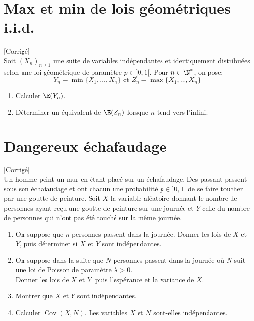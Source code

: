 \documentclass[8pt]{book}
\begin{document}
\section{Max et min de lois géométriques i.i.d. }
\label{Max et min de lois géométriques iid}
\textcolor{blue}{\hyperref[Max et min de lois géométriques iid corrigé]{[Corrigé]}}\\
Soit $(X_n)_{n\geq1}$ une suite de variables indépendantes et identiquement distribuées selon une loi géométrique de paramètre $p\in]0,1[$. Pour $n\in\N^*$, on pose: $$Y_n=\min\{X_1,\dots,X_n\} \text{ et } Z_n=\max\{X_1,\dots,X_n\}$$
\begin{enumerate}
	\item Calculer $\E(Y_n)$.
	\item Déterminer un équivalent de $\E(Z_n)$ lorsque $n$ tend vers l'infini.
\end{enumerate}

\section{Dangereux échafaudage }
\label{Dangereux échafaudage}
\textcolor{blue}{\hyperref[Dangereux échafaudage corrigé]{[Corrigé]}}\\
Un homme peint un mur en étant placé sur un échafaudage. Des passant passent sous son échafaudage et ont chacun une probabilité $p\in ]0,1[$ de se faire toucher par une goutte de peinture. Soit $X$ la variable aléatoire donnant le nombre de personnes ayant reçu une goutte de peinture sur une journée et $Y$ celle du nombre de personnes qui n'ont pas été touché sur la même journée.
\begin{enumerate}
	\item On suppose que $n$ personnes passent dans la journée.
	Donner les lois de $X$ et $Y$, puis déterminer si $X$ et $Y$ sont indépendantes.
	\item On suppose dans la suite que $N$ personnes passent dans la journée où $N$ suit une loi de Poisson de paramètre $\lambda>0$.\\
	Donner les lois de $X$ et $Y$, puis l'espérance et la variance de $X$.
	\item Montrer que $X$ et $Y$ sont indépendantes.
	\item Calculer $\operatorname{Cov}(X,N)$. Les variables $X$ et $N$ sont-elles indépendantes.
\end{enumerate}
\end{document}
